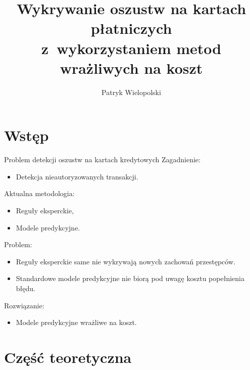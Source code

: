 \documentclass{beamer}
\title{Wykrywanie oszustw na kartach płatniczych \\z~wykorzystaniem metod wrażliwych na koszt}
\institute{Promotor: dr inż. Andrzej Giniewicz \hfill Wydział Matematyki Politechniki Wrocławskiej}
\author{Patryk Wielopolski}
\begin{document}
	
	\newcommand{\htx}{h_{\theta}(\boldsymbol{x_i})}
	\newcommand{\es}{\mathcal{S}}
	\newcommand{\ef}{\mathcal{F}}
	\newcommand{\ku}{\mathcal{Q}}
	\newcommand{\iks}{\boldsymbol{x}}
	\newcommand{\yht}[1]{\hat{y_i}^{(#1)}}
	\newcommand{\ytrue}{\boldsymbol{y}}

\section{Wstęp}

\begin{frame}{Problem detekcji oszustw na kartach kredytowych}
	Zagadnienie:
	\begin{itemize}
		\item Detekcja nieautoryzowanych transakcji.
	\end{itemize}
	\pause
	
	Aktualna metodologia:
	\begin{itemize}
		\item Reguły eksperckie,
		\item Modele predykcyjne.
	\end{itemize}
	\pause
	
	Problem:
	\begin{itemize}
		\item Reguły eksperckie same nie wykrywają nowych zachowań przestępców.
		\item Standardowe modele predykcyjne nie biorą pod uwagę kosztu popełnienia błędu.
	\end{itemize}
	\pause
	
	Rozwiązanie:
	\begin{itemize}
		\item Modele predykcyjne wrażliwe na koszt.
	\end{itemize}
\end{frame}

\section{Część teoretyczna}
\end{document}
